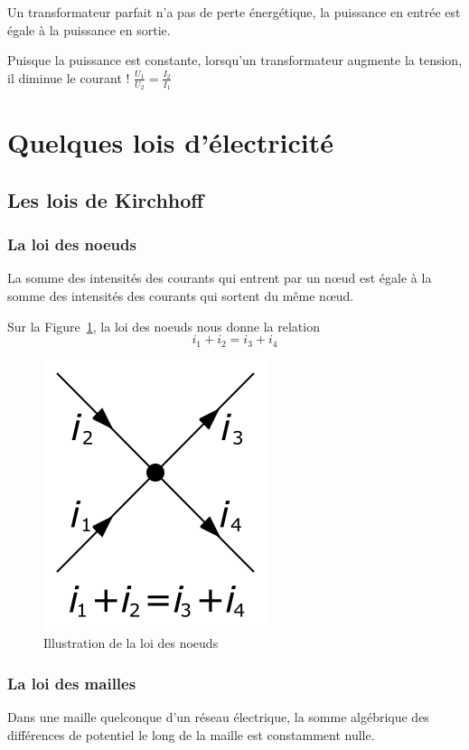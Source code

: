 \documentclass[10pt,fleqn]{article} %
\begin{document}
\begin{remark}
  Un transformateur parfait n'a pas de perte énergétique, la puissance en entrée est égale à la puissance en sortie.
\end{remark}

\begin{warn}
  Puisque la puissance est constante, lorsqu'un transformateur augmente la tension, il diminue le courant ! $\frac{U_1}{U_2} = \frac{I_2}{I_1}$
\end{warn}
\pagebreak
\section{Quelques lois d'électricité}
\subsection{Les lois de Kirchhoff}
\subsubsection{La loi des noeuds}
\begin{aretenir}
  La somme des intensités des courants qui entrent par un nœud est égale à la somme des intensités des courants qui sortent du même nœud.
\end{aretenir}

\begin{exemple}
  Sur la Figure~\ref{fig:noeud}, la loi des noeuds nous donne la relation $$i_1+i_2=i_3+i_4$$
\end{exemple}

\begin{figure}[h]
  \includegraphics[width=.2\textwidth]{images/loi_des_noeuds}
  \centering
  \caption{Illustration de la loi des noeuds}
  \label{fig:noeud}
\end{figure}

\subsubsection{La loi des mailles}

\begin{aretenir}
  Dans une maille quelconque d'un réseau électrique, la somme algébrique des différences de potentiel le long de la maille est constamment nulle.
\end{aretenir}
\end{document}
